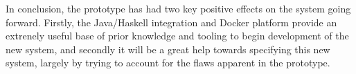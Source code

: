 \documentclass[11pt]{article}
\begin{document}
	In conclusion, the prototype has had two key positive effects on the system going forward. Firstly, the Java/Haskell integration and Docker platform provide an extrenely useful base of prior knowledge and tooling to begin development of the new system, and secondly it will be a great help towards specifying this new system, largely by trying to account for the flaws apparent in the prototype.
\end{document}
